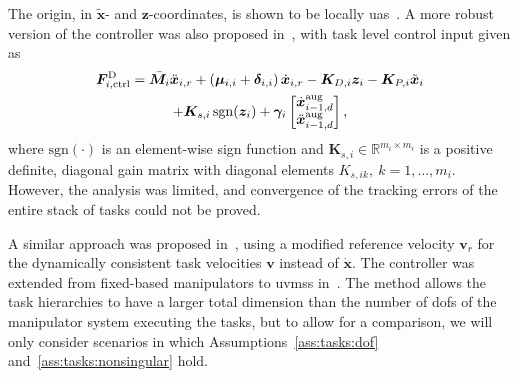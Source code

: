 \documentclass[../main.tex]{subfiles}
\begin{document}
The origin, in $\tilde{\bm{x}}$- and $\bm{z}$-coordinates, is shown to be locally \gls{uas}~\cite{Saeboe2022}. A more robust version of the controller was also proposed in~\cite{Saeboe2022}, with task level control input given as
\begin{multline}\label{eq:comp:F_ictrl_robust_z}
    \bm{F}^{\textrm{D}}_{i,\textrm{ctrl}} = \bar{\bm{M}}_i \ddot{\bm{x}}_{i,r} + \left( \bm{\mu}_{i,i} + \bm{\delta}_{i,i} \right) \dot{\bm{x}}_{i,r} - \bm{K}_{D,i} \bm{z}_i - \bm{K}_{P,i} \tilde{\bm{x}}_i \\
    + \bm{K}_{s,i} \operatorname{\mathrm{sgn}}(\bm{z}_i)
    + \bm{\gamma}_i \begin{bmatrix} \dot{\bm{x}}^{\textrm{aug}}_{i-1,d} \\ \ddot{\bm{x}}^{\textrm{aug}}_{i-1,d}
    \end{bmatrix},
\end{multline}
where $\textrm{sgn}(\cdot)$ is an element-wise sign function and $\bm{K}_{s,i} \in \mathbb{R}^{m_i \times m_i}$  is a positive definite, diagonal gain matrix with diagonal elements $K_{s,ik}, ~k=1,\ldots,m_i$. However, the analysis was limited, and convergence of the tracking errors of the entire stack of tasks could not be proved.

A similar approach was proposed in~\cite{Garofalo2020}, using a modified reference velocity $\bm{v}_r$ for the dynamically consistent task velocities $\bm{v}$ instead of $\dot{\bm{x}}$. The controller was extended from fixed-based manipulators to \glspl{uvms} in~\cite{DyrhaugTveter2023}. The method  allows the task hierarchies to have a larger total dimension than the number of \glspl{dof} of the manipulator system executing the tasks, but to allow for a comparison, we will only consider scenarios in which Assumptions~\ref{ass:tasks:dof} and~\ref{ass:tasks:nonsingular} hold.
\end{document}
